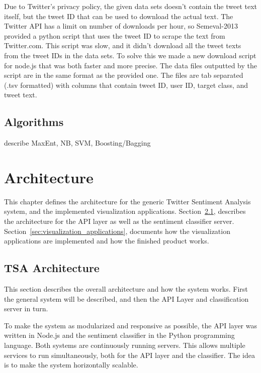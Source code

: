 Due to Twitter's privacy policy, the given data sets doesn't contain the tweet text itself, but the tweet ID that can be used to download the actual text. The Twitter API has a limit on number of downloads per hour, so Semeval-2013 provided a python script that uses the tweet ID to scrape the text from Twitter.com. This script was slow, and it didn't download all the tweet texts from the tweet IDs in the data sets. To solve this we made a new download script for node.js that was both faster and more precise. The data files outputted by the script are in the same format as the provided one. The files are tab separated (.tsv formatted) with columns that contain tweet ID, user ID, target class, and tweet text.

\section{Algorithms}

describe MaxEnt, NB, SVM, Boosting/Bagging


\chapter{Architecture}
\label{sec:experimentalsetup}

This chapter defines the architecture for the generic Twitter Sentiment Analysis system, and the implemented visualization applications. Section~\ref{sec:tsaarchitecture}, describes the architecture for the API layer as well as the sentiment classifier server. Section~\ref{sec:visualization_applications}, documents how the visualization applications are implemented and how the finished product works.

\section{TSA Architecture}
\label{sec:tsaarchitecture}

This section describes the overall architecture and how the system works. First the general system will be described, and then the API Layer and classification server in turn.  

To make the system as modularized and responsive as possible, the API layer was written in Node.js and the sentiment classifier in the Python programming language. Both systems are continuously running servers. This allows multiple services to run simultaneously, both for the API layer and the classifier. The idea is to make the system horizontally scalable.

